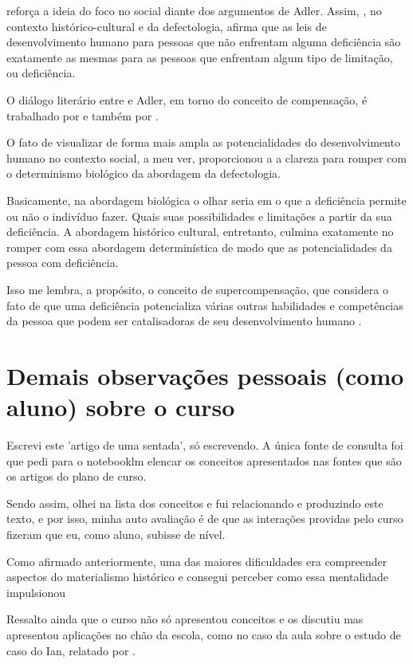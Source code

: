\documentclass{../../common-shared/cls/Article_Class_RevInfor}
\begin{document}
\Vig{} reforça a ideia do foco no social diante dos argumentos de Adler. Assim, \Vig{}, no contexto histórico-cultural e da defectologia, afirma que as leis de desenvolvimento humano para pessoas que não enfrentam alguma deficiência são exatamente as mesmas para as pessoas que enfrentam algum tipo de limitação, ou deficiência. 

O diálogo literário entre \Vig{} e Adler, em torno do
conceito de compensação, é trabalhado por 
e também por .

O fato de visualizar de forma mais ampla as potencialidades do
desenvolvimento humano no contexto social, a meu ver, proporcionou a
\Vig{} a clareza para romper com o determinismo biológico da abordagem
da defectologia.

Basicamente, na abordagem biológica o olhar seria em o que a
deficiência permite ou não o indivíduo fazer. Quais suas possibilidades
e limitações a partir da sua deficiência. A abordagem histórico cultural, entretanto,
culmina exatamente no romper com essa abordagem determinística de modo
que as potencialidades da pessoa com deficiência. 

Isso me lembra, a propósito, o conceito de supercompensação, que considera o
fato de que uma deficiência potencializa várias outras habilidades e
competências da pessoa que podem ser catalisadoras de seu
desenvolvimento humano \cite{dainez2014conceito,dainez2013concept}.

\section{Demais observações pessoais (como aluno)  sobre o curso}
Escrevi este 'artigo de uma sentada', só escrevendo. A única fonte de
consulta foi que pedi para o notebooklm elencar os conceitos
apresentados nas fontes que são os artigos do plano de curso.

Sendo assim, olhei na lista dos conceitos e fui relacionando e produzindo
este texto, e por isso, minha auto avaliação é de que as interações
providas pelo curso fizeram que eu, como aluno, subisse de nível.

Como afirmado anteriormente, uma das maiores dificuldades era
compreender aspectos do materialismo histórico e consegui perceber
como essa mentalidade impulsionou \Vig{}

Ressalto ainda que o curso não só apresentou conceitos e os discutiu
mas apresentou aplicações no chão da escola, como no caso da aula
sobre o estudo de caso do Ian, relatado por .
\end{document}
